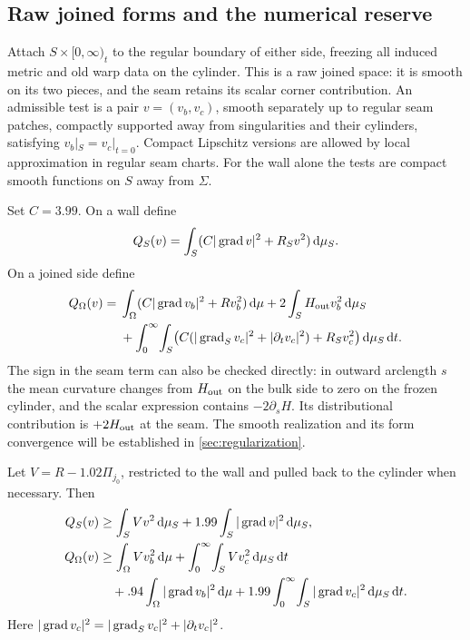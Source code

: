 \subsection{Raw joined forms and the numerical reserve}

Attach $S\times[0,\infty)_t$ to the regular boundary of either side,
freezing all induced metric and old warp data on the cylinder.  This
is a raw joined space: it is smooth on its two pieces, and the seam
retains its scalar corner contribution.  An admissible test is a pair
$v=(v_b,v_c)$, smooth separately up to regular seam patches, compactly
supported away from singularities and their cylinders, satisfying
$v_b|_S=v_c|_{t=0}$.  Compact Lipschitz versions are allowed by local
approximation in regular seam charts.  For the wall alone the tests are
compact smooth functions on $S$ away from $\Sigma$.

Set $C=3.99$.  On a wall define
\[
 Q_S(v)=\int_S(C|\operatorname{grad} v|^2+R_Sv^2)\,\mathrm d\mu_S.
\]
On a joined side define
\begin{align}\label{cut:raw-form}
 Q_\Omega(v)
  ={}&\int_\Omega(C|\operatorname{grad} v_b|^2+Rv_b^2)\,\mathrm d\mu
       +2\int_S H_{\rm out}v_b^2\,\mathrm d\mu_S\notag\\
    &+\int_0^\infty\!\int_S
        \bigl(C(|\operatorname{grad}_Sv_c|^2+|\partial_tv_c|^2)
                         +R_Sv_c^2\bigr)\,\mathrm d\mu_S\,\mathrm d t.
\end{align}
The sign in the seam term can also be checked directly: in outward
arclength $s$ the mean curvature changes from $H_{\rm out}$ on the
bulk side to zero on the frozen cylinder, and the scalar expression
contains $-2\partial_sH$.  Its distributional contribution is
$+2H_{\rm out}$ at the seam.  The smooth realization and its form
convergence will be established in \cref{sec:regularization}.

\begin{proposition}\label{cut:raw-domination}
Let $V=R-1.02\Pi_{j_0}$, restricted to the wall and pulled back to the
cylinder when necessary.  Then
\begin{align}\label{cut:wall-domination}
 Q_S(v)&\ge\int_S Vv^2\,\mathrm d\mu_S
                    +1.99\int_S|\operatorname{grad} v|^2\,\mathrm d\mu_S,\\
 Q_\Omega(v)&\ge\int_\Omega Vv_b^2\,\mathrm d\mu
       +\int_0^\infty\!\int_S Vv_c^2\,\mathrm d\mu_S\,\mathrm d t\notag\\
 &\quad+.94\int_\Omega|\operatorname{grad} v_b|^2\,\mathrm d\mu
       +1.99\int_0^\infty\!\int_S|\operatorname{grad} v_c|^2
                                      \,\mathrm d\mu_S\,\mathrm d t.
                                      \label{cut:side-domination}
\end{align}
Here $|\operatorname{grad} v_c|^2=|\operatorname{grad}_Sv_c|^2+|\partial_tv_c|^2$.
\end{proposition}

